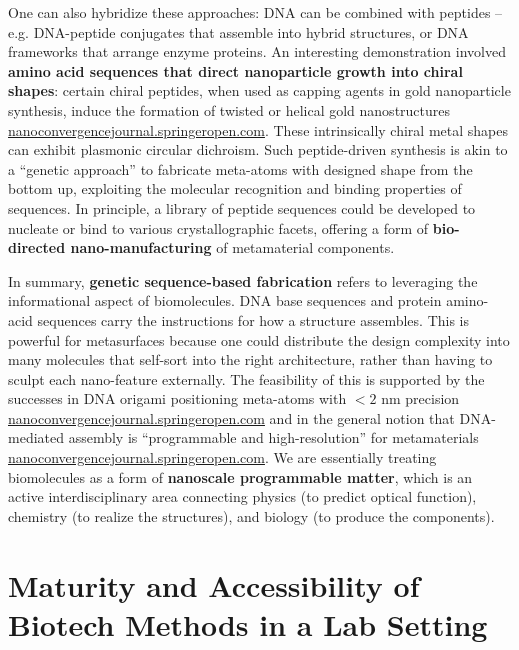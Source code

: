 \documentclass[11pt,a4paper]{article}
\begin{document}
One can also hybridize these approaches: DNA can be combined with peptides -- e.g. DNA-peptide conjugates that assemble into hybrid structures, or DNA frameworks that arrange enzyme proteins. An interesting demonstration involved \textbf{amino acid sequences that direct nanoparticle growth into chiral shapes}: certain chiral peptides, when used as capping agents in gold nanoparticle synthesis, induce the formation of twisted or helical gold nanostructures \href{https://nanoconvergencejournal.springeropen.com/articles/10.1186/s40580-020-00226-7#:~:text=that enabled the reconfigurability,directed helical}{nanoconvergencejournal.springeropen.com}. These intrinsically chiral metal shapes can exhibit plasmonic circular dichroism. Such peptide-driven synthesis is akin to a ``genetic approach'' to fabricate meta-atoms with designed shape from the bottom up, exploiting the molecular recognition and binding properties of sequences. In principle, a library of peptide sequences could be developed to nucleate or bind to various crystallographic facets, offering a form of \textbf{bio-directed nano-manufacturing} of metamaterial components.

In summary, \textbf{genetic sequence-based fabrication} refers to leveraging the informational aspect of biomolecules. DNA base sequences and protein amino-acid sequences carry the instructions for how a structure assembles. This is powerful for metasurfaces because one could distribute the design complexity into many molecules that self-sort into the right architecture, rather than having to sculpt each nano-feature externally. The feasibility of this is supported by the successes in DNA origami positioning meta-atoms with $<2$ nm precision \href{https://nanoconvergencejournal.springeropen.com/articles/10.1186/s40580-020-00226-7#:~:text=fabricated by self,DNA sequences for achieving different}{nanoconvergencejournal.springeropen.com} and in the general notion that DNA-mediated assembly is ``programmable and high-resolution'' for metamaterials \href{https://nanoconvergencejournal.springeropen.com/articles/10.1186/s40580-020-00226-7#:~:text=DNA,143]. Here%2C DNA is}{nanoconvergencejournal.springeropen.com}. We are essentially treating biomolecules as a form of \textbf{nanoscale programmable matter}, which is an active interdisciplinary area connecting physics (to predict optical function), chemistry (to realize the structures), and biology (to produce the components).

\section{Maturity and Accessibility of Biotech Methods in a Lab Setting}
\end{document}
